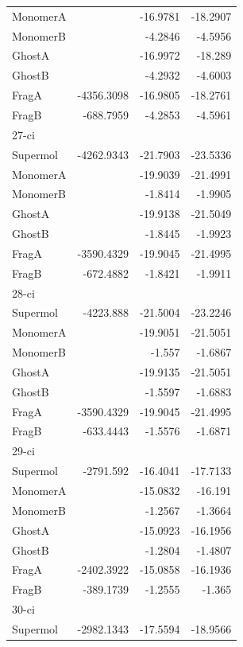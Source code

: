 \documentclass[journal=jctcce,manuscript=article]{achemso}
\begin{document}
\begin{spacing}{1}
\begin{longtable}{lRRR}
    MonomerA &       & -16.9781 & -18.2907 \\
    MonomerB &       & -4.2846 & -4.5956 \\
    GhostA &       & -16.9972 & -18.289 \\
    GhostB &       & -4.2932 & -4.6003 \\
    FragA & -4356.3098 & -16.9805 & -18.2761 \\
    FragB & -688.7959 & -4.2853 & -4.5961 \\
    27-ci &       &       &  \\
    Supermol & -4262.9343 & -21.7903 & -23.5336 \\
    MonomerA &       & -19.9039 & -21.4991 \\
    MonomerB &       & -1.8414 & -1.9905 \\
    GhostA &       & -19.9138 & -21.5049 \\
    GhostB &       & -1.8445 & -1.9923 \\
    FragA & -3590.4329 & -19.9045 & -21.4995 \\
    FragB & -672.4882 & -1.8421 & -1.9911 \\
    28-ci &       &       &  \\
    Supermol & -4223.888 & -21.5004 & -23.2246 \\
    MonomerA &       & -19.9051 & -21.5051 \\
    MonomerB &       & -1.557 & -1.6867 \\
    GhostA &       & -19.9135 & -21.5051 \\
    GhostB &       & -1.5597 & -1.6883 \\
    FragA & -3590.4329 & -19.9045 & -21.4995 \\
    FragB & -633.4443 & -1.5576 & -1.6871 \\
    29-ci &       &       &  \\
    Supermol & -2791.592 & -16.4041 & -17.7133 \\
    MonomerA &       & -15.0832 & -16.191 \\
    MonomerB &       & -1.2567 & -1.3664 \\
    GhostA &       & -15.0923 & -16.1956 \\
    GhostB &       & -1.2804 & -1.4807 \\
    FragA & -2402.3922 & -15.0858 & -16.1936 \\
    FragB & -389.1739 & -1.2555 & -1.365 \\
    30-ci &       &       &  \\
    Supermol & -2982.1343 & -17.5594 & -18.9566 \\

\end{longtable}
\end{spacing}
\end{document}
